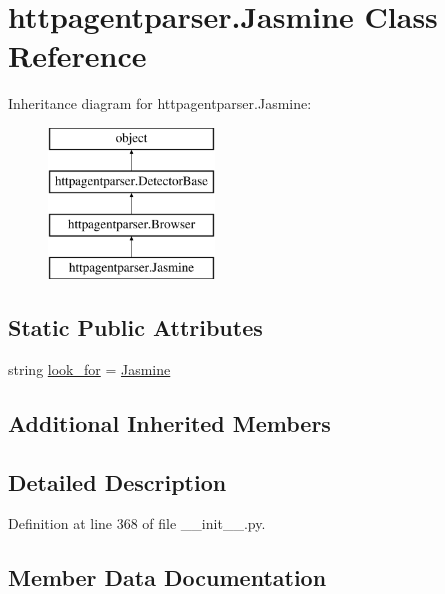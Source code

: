 \hypertarget{classhttpagentparser_1_1_jasmine}{}\section{httpagentparser.\+Jasmine Class Reference}
\label{classhttpagentparser_1_1_jasmine}
Inheritance diagram for httpagentparser.\+Jasmine\+:\begin{figure}[H]
\begin{center}
\leavevmode
\includegraphics[height=4.000000cm]{classhttpagentparser_1_1_jasmine}
\end{center}
\end{figure}
\subsection*{Static Public Attributes}
\begin{DoxyCompactItemize}
\item 
string \hyperlink{classhttpagentparser_1_1_jasmine_a5bb69b2f6578152d6ab8f8dc9926b907}{look\+\_\+for} = \textquotesingle{}\hyperlink{classhttpagentparser_1_1_jasmine}{Jasmine}\textquotesingle{}
\end{DoxyCompactItemize}
\subsection*{Additional Inherited Members}


\subsection{Detailed Description}


Definition at line 368 of file \+\_\+\+\_\+init\+\_\+\+\_\+.\+py.



\subsection{Member Data Documentation}
\hypertarget{classhttpagentparser_1_1_jasmine_a5bb69b2f6578152d6ab8f8dc9926b907}{}\label{classhttpagentparser_1_1_jasmine_a5bb69b2f6578152d6ab8f8dc9926b907} 
